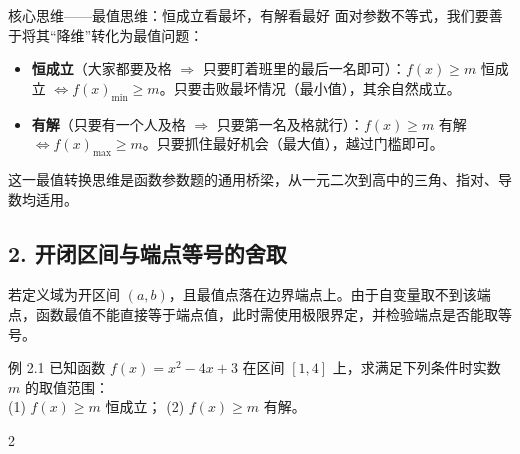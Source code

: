 \documentclass[11pt,a4paper]{ctexart}
\begin{document}
\begin{keybox}{核心思维——最值思维：恒成立看最坏，有解看最好}
面对参数不等式，我们要善于将其“降维”转化为最值问题：
\begin{itemize}
  \item \textbf{恒成立}（大家都要及格 $\Rightarrow$ 只要盯着班里的最后一名即可）：$f(x) \ge m$ 恒成立 $\Longleftrightarrow f(x)_{\min} \ge m$。只要击败最坏情况（最小值），其余自然成立。
  \item \textbf{有解}（只要有一个人及格 $\Rightarrow$ 只要第一名及格就行）：$f(x) \ge m$ 有解 $\Longleftrightarrow f(x)_{\max} \ge m$。只要抓住最好机会（最大值），越过门槛即可。
\end{itemize}
这一最值转换思维是函数参数题的通用桥梁，从一元二次到高中的三角、指对、导数均适用。
\end{keybox}

\subsection{2. 开闭区间与端点等号的舍取}
若定义域为开区间 $(a,b)$，且最值点落在边界端点上。由于自变量取不到该端点，函数最值不能直接等于端点值，此时需使用极限界定，并检验端点是否能取等号。

\begin{exbox}{例 2.1}
已知函数 $f(x)=x^2-4x+3$ 在区间 $[1,4]$ 上，求满足下列条件时实数 $m$ 的取值范围：\\
(1) $f(x) \ge m$ 恒成立； \quad (2) $f(x) \ge m$ 有解。
\end{exbox}

\begin{paracol}{2}
\switchcolumn
{}
\end{paracol}
\end{document}
